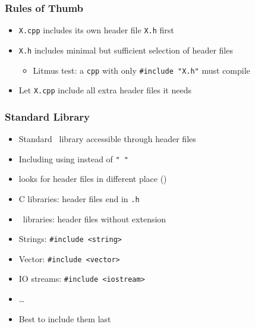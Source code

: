 \documentclass{../ucll-slides}
\begin{document}
\begin{frame}
  \frametitle{Rules of Thumb}
  \begin{itemize}
    \item {\tt X.cpp} includes its own header file {\tt X.h} first
    \item {\tt X.h} includes minimal but sufficient selection of header files
      \begin{itemize}
        \item Litmus test: a {\tt cpp} with only {\tt \#include "X.h"} must compile
      \end{itemize}
    \item Let {\tt X.cpp} include all extra header files it needs
  \end{itemize}
\end{frame}

\begin{frame}
  \frametitle{Standard Library}
  \begin{itemize}
    \item Standard \cpp\ library accessible through header files
    \item Including using {\tt < >} instead of {\tt " "}
    \item {\tt < >} looks for header files in different place ()
    \item C libraries: header files end in {\tt .h}
    \item \cpp\ libraries: header files without extension
    \item Strings: {\tt \#include <string>}
    \item Vector: {\tt \#include <vector>}
    \item IO streams: {\tt \#include <iostream>}
    \item \dots
    \item Best to include them last \cake
  \end{itemize}
\end{frame}
\end{document}
